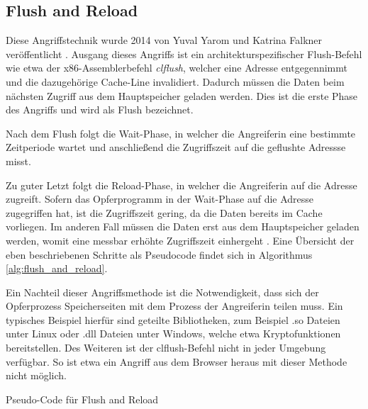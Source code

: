 
\subsection{Flush and Reload}

Diese Angriffstechnik wurde 2014 von Yuval Yarom
und Katrina Falkner veröffentlicht \cite{FlushReload}.
Ausgang dieses Angriffs ist ein architekturspezifischer Flush-Befehl wie etwa der x86-Assemblerbefehl \textit{clflush}, welcher eine Adresse entgegennimmt und die dazugehörige Cache-Line invalidiert. 
Dadurch müssen die Daten beim nächsten Zugriff aus dem Hauptspeicher geladen werden. Dies ist die erste Phase des Angriffs und wird als Flush bezeichnet. 

Nach dem Flush folgt die Wait-Phase, in welcher die Angreiferin eine bestimmte Zeitperiode wartet und anschließend die Zugriffszeit auf die geflushte Adressse misst. 

Zu guter Letzt folgt die Reload-Phase, in welcher die Angreiferin auf die Adresse zugreift. Sofern das Opferprogramm in der Wait-Phase auf die Adresse zugegriffen hat, ist die Zugriffszeit gering, da die Daten bereits im Cache vorliegen.
Im anderen Fall müssen die Daten erst aus dem Hauptspeicher geladen werden, womit eine messbar erhöhte Zugriffszeit einhergeht \cite{FlushReload}. Eine Übersicht der eben beschriebenen Schritte als Pseudocode findet sich in Algorithmus \ref{alg:flush_and_reload}.

Ein Nachteil dieser Angriffsmethode ist die Notwendigkeit, dass sich der Opferprozess Speicherseiten mit dem Prozess der Angreiferin teilen muss. 
Ein typisches Beispiel hierfür sind geteilte Bibliotheken, zum Beispiel .so Dateien unter Linux oder .dll Dateien unter Windows, welche etwa Kryptofunktionen bereitstellen. Des Weiteren ist der clflush-Befehl nicht in jeder Umgebung verfügbar. So ist etwa ein Angriff aus dem Browser heraus mit dieser Methode nicht möglich. 



\begin{algorithm}[h]
\DontPrintSemicolon
\caption{Pseudo-Code für Flush and Reload}
\label{alg:flush_and_reload}



\end{algorithm}

